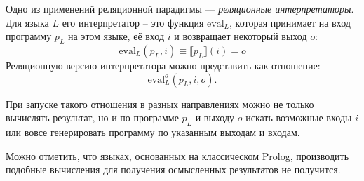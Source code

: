 
Одно из применений реляционной парадигмы --- {\it реляционные интерпретаторы}.
Для языка $L$ его интерпретатор -- это функция $\text{eval}_L$, которая принимает
на вход программу $p_L$ на этом языке, её вход $i$ и возвращает некоторый выход $o$:
\[ \text{eval}_L (p_L, i) \equiv \llbracket p_L \rrbracket (i) = o \]
Реляционную версию интерпретатора можно представить как отношение:
\[ \text{eval}_L^o(p_L, i, o). \]

При запуске такого отношения в разных направлениях можно не только вычислять результат,
но и по программе $p_L$ и выходу $o$
искать возможные входы $i$ или вовсе генерировать программу по указанным
выходам и входам.

Можно отметить, что языках, основанных на классическом Prolog, производить
подобные вычисления для получения осмысленных результатов не получится.

